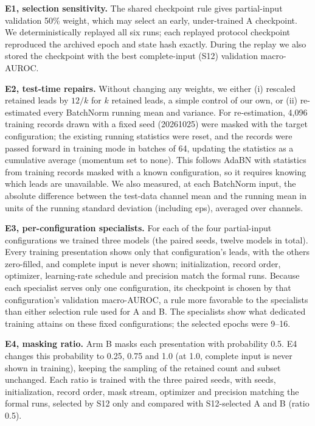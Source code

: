 \textbf{E1, selection sensitivity.} The shared checkpoint rule gives partial-input validation 50\% weight, which may select an early, under-trained A checkpoint. We deterministically replayed all six runs; each replayed protocol checkpoint reproduced the archived epoch and state hash exactly. During the replay we also stored the checkpoint with the best complete-input (S12) validation macro-AUROC.

\textbf{E2, test-time repairs.} Without changing any weights, we either (i) rescaled retained leads by $12/k$ for $k$ retained leads, a simple control of our own, or (ii) re-estimated every BatchNorm running mean and variance. For re-estimation, 4,096 training records drawn with a fixed seed (20261025) were masked with the target configuration; the existing running statistics were reset, and the records were passed forward in training mode in batches of 64, updating the statistics as a cumulative average (momentum set to none). This follows AdaBN with statistics from training records masked with a known configuration, so it requires knowing which leads are unavailable. We also measured, at each BatchNorm input, the absolute difference between the test-data channel mean and the running mean in units of the running standard deviation (including eps), averaged over channels.

\textbf{E3, per-configuration specialists.} For each of the four partial-input configurations we trained three models (the paired seeds, twelve models in total). Every training presentation shows only that configuration's leads, with the others zero-filled, and complete input is never shown; initialization, record order, optimizer, learning-rate schedule and precision match the formal runs. Because each specialist serves only one configuration, its checkpoint is chosen by that configuration's validation macro-AUROC, a rule more favorable to the specialists than either selection rule used for A and B. The specialists show what dedicated training attains on these fixed configurations; the selected epochs were 9--16.

\textbf{E4, masking ratio.} Arm B masks each presentation with probability 0.5. E4 changes this probability to 0.25, 0.75 and 1.0 (at 1.0, complete input is never shown in training), keeping the sampling of the retained count and subset unchanged. Each ratio is trained with the three paired seeds, with seeds, initialization, record order, mask stream, optimizer and precision matching the formal runs, selected by S12 only and compared with S12-selected A and B (ratio 0.5).

